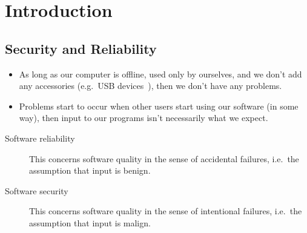 \mode*




\section{Introduction}

\subsection{Security and Reliability}

\begin{frame}
  \begin{remark}
    \begin{itemize}
      \item As long as our computer is offline, used only by ourselves, and we 
        don't add any accessories (e.g.\ USB devices~\cite{ieeespectrum2014usb}), 
        then we don't have any problems.

        \pause

      \item Problems start to occur when other users start using our software (in 
        some way), then input to our programs isn't necessarily what we expect.

    \end{itemize}
  \end{remark}
\end{frame}

\begin{frame}
  \begin{description}
    \item[Software reliability] This concerns software quality in the sense of 
      accidental failures, i.e.\ the assumption that input is benign.

      \pause{}

    \item[Software security] This concerns software quality in the sense of 
      intentional failures, i.e.\ the assumption that input is malign.
  \end{description}
\end{frame}

